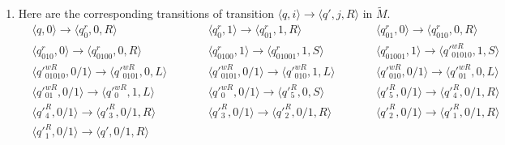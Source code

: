 \documentclass[12pt,a4paper]{article}
\makeatletter
\newtheorem*{solution}{Solution}
\theoremstyle{definition}
\renewenvironment{solution}[1][Solution] {\par\pushQED{\qed}\normalfont\topsep6\p@\@plus6\p@\relax\trivlist\item[\hskip\labelsep\bfseries#1\@addpunct{.}]\ignorespaces}{\popQED\endtrivlist\@endpefalse} \makeatother
\makeatother
\begin{document}
\begin{enumerate}
\begin{solution}
Here are the corresponding transitions of transition $\langle q, i \rangle \rightarrow \langle q',j, R\rangle$ in $\tilde{M}$.
\begin{displaymath}
\begin{aligned}
&\langle q, 0 \rangle \rightarrow \langle q^r_{0}, 0, R\rangle \qquad
&&\langle q^r_{0}, 1 \rangle \rightarrow \langle q^r_{01}, 1, R\rangle \qquad
&&\langle q^r_{01}, 0 \rangle \rightarrow \langle q^r_{010}, 0, R\rangle \\
&\langle q^r_{010}, 0 \rangle \rightarrow \langle q^r_{0100}, 0, R\rangle \qquad
&&\langle q^r_{0100}, 1 \rangle \rightarrow \langle q^r_{01001}, 1, S\rangle \qquad
&&\langle q^r_{01001}, 1 \rangle \rightarrow \langle q'^{wR}_{01010}, 1, S\rangle \\
&\langle q'^{wR}_{01010}, 0/1 \rangle \rightarrow \langle q'^{wR}_{0101}, 0, L\rangle \qquad
&&\langle q'^{wR}_{0101}, 0/1 \rangle \rightarrow \langle q'^{wR}_{010}, 1, L\rangle \qquad
&&\langle q'^{wR}_{010}, 0/1 \rangle \rightarrow \langle q'^{wR}_{01}, 0, L\rangle \\
&\langle q'^{wR}_{01}, 0/1 \rangle \rightarrow \langle q'^{wR}_{0}, 1, L\rangle \qquad
&&\langle q'^{wR}_{0}, 0/1 \rangle \rightarrow \langle q'^R_5, 0, S\rangle \qquad
&&\langle q'^R_5, 0/1 \rangle \rightarrow \langle q'^R_4, 0/1, R\rangle \\
&\langle q'^R_4, 0/1 \rangle \rightarrow \langle q'^R_3, 0/1, R\rangle \qquad
&&\langle q'^R_3, 0/1 \rangle \rightarrow \langle q'^R_2, 0/1, R\rangle \qquad
&&\langle q'^R_2, 0/1 \rangle \rightarrow \langle q'^R_1, 0/1, R\rangle \\
&\langle q'^R_1, 0/1 \rangle \rightarrow \langle q', 0/1, R\rangle
\end{aligned}
\end{displaymath}


\end{solution}
\end{enumerate}
\end{document}
